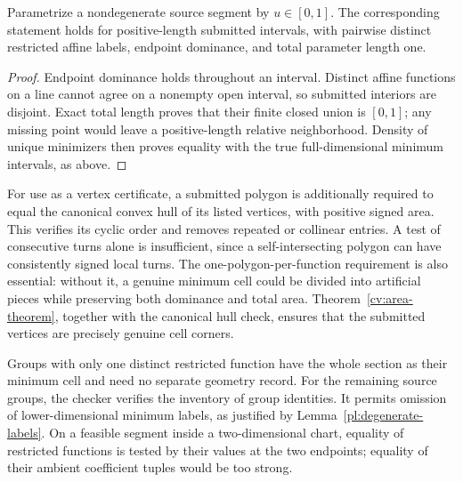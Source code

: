 \begin{corollary}
\label{cv:length-theorem}
Parametrize a nondegenerate source segment by \(u\in[0,1]\).
The corresponding statement holds for positive-length submitted
intervals, with pairwise distinct restricted affine labels,
endpoint dominance, and total parameter length one.
\end{corollary}
\begin{proof}
Endpoint dominance holds throughout an interval.
Distinct affine functions on a line cannot agree on a nonempty
open interval, so submitted interiors are disjoint.
Exact total length proves that their finite closed union is
\([0,1]\); any missing point would leave a positive-length relative
neighborhood.  Density of unique minimizers then proves equality
with the true full-dimensional minimum intervals, as above.
\end{proof}

For use as a vertex certificate, a submitted polygon is additionally
required to equal the canonical convex hull of its listed vertices,
with positive signed area.  This verifies its cyclic order and
removes repeated or collinear entries.  A test of consecutive
turns alone is insufficient, since a self-intersecting polygon
can have consistently signed local turns.
The one-polygon-per-function requirement is also essential:
without it, a genuine minimum cell could be divided into artificial
pieces while preserving both dominance and total area.
Theorem~\ref{cv:area-theorem}, together with the canonical hull
check, ensures that the submitted vertices are precisely genuine
cell corners.

Groups with only one distinct restricted function have the whole
section as their minimum cell and need no separate geometry record.
For the remaining source groups, the checker verifies the inventory
of group identities.  It permits omission of lower-dimensional
minimum labels, as justified by Lemma~\ref{pl:degenerate-labels}.
On a feasible segment inside a two-dimensional chart, equality of
restricted functions is tested by their values at the two endpoints;
equality of their ambient coefficient tuples would be too strong.

